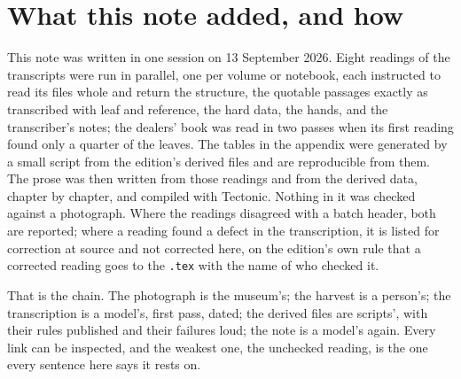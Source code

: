 \section{What this note added, and how}

This note was written in one session on 13 September 2026. Eight readings of the transcripts were run in parallel, one per volume or notebook, each instructed to read its files whole and return the structure, the quotable passages exactly as transcribed with leaf and reference, the hard data, the hands, and the transcriber's notes; the dealers' book was read in two passes when its first reading found only a quarter of the leaves. The tables in the appendix were generated by a small script from the edition's derived files and are reproducible from them. The prose was then written from those readings and from the derived data, chapter by chapter, and compiled with Tectonic. Nothing in it was checked against a photograph. Where the readings disagreed with a batch header, both are reported; where a reading found a defect in the transcription, it is listed for correction at source and not corrected here, on the edition's own rule that a corrected reading goes to the \texttt{.tex} with the name of who checked it.

That is the chain. The photograph is the museum's; the harvest is a person's; the transcription is a model's, first pass, dated; the derived files are scripts', with their rules published and their failures loud; the note is a model's again. Every link can be inspected, and the weakest one, the unchecked reading, is the one every sentence here says it rests on.
